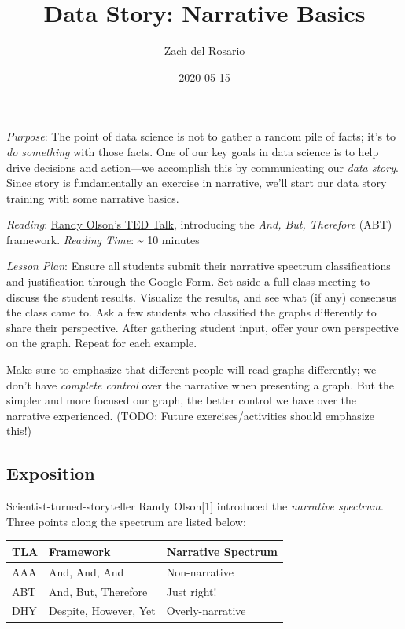 \documentclass[
]{article}
\title{Data Story: Narrative Basics}
\author{Zach del Rosario}
\date{2020-05-15}
\begin{document}
\maketitle

\emph{Purpose}: The point of data science is not to gather a random pile
of facts; it's to \emph{do something} with those facts. One of our key
goals in data science is to help drive decisions and action---we
accomplish this by communicating our \emph{data story}. Since story is
fundamentally an exercise in narrative, we'll start our data story
training with some narrative basics.

\emph{Reading}: \href{https://www.youtube.com/watch?v=ERB7ITvabA4}{Randy
Olson's TED Talk}, introducing the \emph{And, But, Therefore} (ABT)
framework. \emph{Reading Time}: \textasciitilde{} 10 minutes

\emph{Lesson Plan}: Ensure all students submit their narrative spectrum
classifications and justification through the Google Form. Set aside a
full-class meeting to discuss the student results. Visualize the
results, and see what (if any) consensus the class came to. Ask a few
students who classified the graphs differently to share their
perspective. After gathering student input, offer your own perspective
on the graph. Repeat for each example.

Make sure to emphasize that different people will read graphs
differently; we don't have \emph{complete control} over the narrative
when presenting a graph. But the simpler and more focused our graph, the
better control we have over the narrative experienced. (TODO: Future
exercises/activities should emphasize this!)

\hypertarget{exposition}{%
\subsection{Exposition}\label{exposition}}

Scientist-turned-storyteller Randy Olson{[}1{]} introduced the
\emph{narrative spectrum}. Three points along the spectrum are listed
below:

\begin{longtable}[]{@{}lll@{}}
\toprule
TLA & Framework & Narrative Spectrum\tabularnewline
\midrule
\endhead
AAA & And, And, And & Non-narrative\tabularnewline
ABT & And, But, Therefore & Just right!\tabularnewline
DHY & Despite, However, Yet & Overly-narrative\tabularnewline
\bottomrule
\end{longtable}
\end{document}
